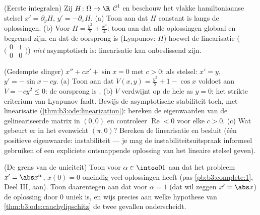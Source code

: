\begin{exercise}[$\star\star$]\label{exo:b3:ode:7}
(Eerste integralen) Zij $H \colon \Omega \to \R$ $\mathcal C^1$
en beschouw het vlakke hamiltoniaanse stelsel $x' = \partial_yH$,
$y' = -\partial_xH$.
(a) Toon aan dat $H$ constant is langs de oplossingen.
(b) Voor $H = \frac{y^2}2 + \frac{x^4}4$: toon aan dat alle
oplossingen globaal en begrensd zijn, en dat de oorsprong 
is (Lyapunov: $H$) hoewel de linearisatie
($\bigl(\begin{smallmatrix}0&1\\0&0\end{smallmatrix}\bigr)$)
\emph{niet} asymptotisch  is: linearisatie kan
onbeslissend zijn.
\end{exercise}

\begin{exercise}[$\star\star\star$]\label{exo:b3:ode:8}
(Gedempte slinger) $x'' + cx' + \sin x = 0$ met $c > 0$; als
stelsel: $x' = y$, $y' = -\sin x - cy$.
(a) Toon aan dat $V(x, y) = \frac{y^2}2 + 1 - \cos x$ voldoet aan
$\dot V = -cy^2 \leq 0$: de oorsprong is .
(b) $\dot V$ verdwijnt op de hele as $y = 0$: het strikte
criterium van Lyapunov faalt. Bewijs de asymptotische stabiliteit
toch, met linearisatie (\cref{thm:b3:ode:linearization}): bereken
de eigenwaarden van de gelineariseerde matrix in $(0,0)$ en
controleer $\operatorname{Re} < 0$ voor elke $c > 0$.
(c) Wat gebeurt er in het evenwicht $(\pi, 0)$? Bereken de
linearisatie en besluit (één positieve eigenwaarde: instabiliteit
--- je mag de instabiliteitsuitspraak informeel gebruiken of een
expliciete ontsnappende oplossing van het lineaire stelsel
geven).
\end{exercise}

\begin{exercise}[$\star\star$]\label{exo:b3:ode:9}
(De grens van de uniciteit) Toon voor $\alpha \in \intoo01$ aan
dat het probleem $x' = \abs x^{\alpha}$, $x(0) = 0$ oneindig veel
oplossingen heeft (pas \cref{pb:b3:complete:1}, Deel III, aan).
Toon daarentegen aan dat voor $\alpha = 1$ (dat wil zeggen $x' =
\abs x$) de oplossing door $0$ uniek is, en wijs precies aan
welke hypothese van \cref{thm:b3:ode:cauchylipschitz} de twee
gevallen onderscheidt.
\end{exercise}

